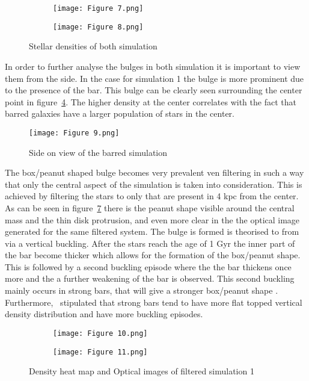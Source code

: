 \documentclass[12pt, a4paper]{article}
\begin{document}
\begin{figure}[H]
  \centering
  \begin{subfigure}{.5\textwidth}
    \centering
    \texttt{[image: Figure 7.png]}
    \label{fig:star_density_1}
  \end{subfigure}%
  \begin{subfigure}{.5\textwidth}
    \centering
    \texttt{[image: Figure 8.png]}
    \label{fig:star_density_2}
  \end{subfigure}
  \caption{Stellar densities of both simulation}
  \label{fig:Stellar_component_2sim}
\end{figure}

In order to further analyse the bulges in both simulation it is important to view them from the side. In the case for simulation 1 the bulge is more prominent due to the presence of the bar. This bulge can be clearly seen surrounding the center point in figure~\ref{fig:side_on_bar}. The higher density at the center correlates with the fact that barred galaxies have a larger population of stars in the center. 

\begin{figure}[H]
  \centering
  \texttt{[image: Figure 9.png]}
  \caption{Side on view of the barred simulation}\label{fig:side_on_bar}
\end{figure}

The box/peanut shaped bulge becomes very prevalent ven filtering in such a way that only the central aspect of the simulation is taken into consideration. This is achieved by filtering the stars to only that are present in 4 kpc from the center. As can be seen in figure~\ref{fig:filter_sphere_com_1} there is the peanut shape visible around the central mass and the thin disk protrusion, and even more clear in the the optical image generated for the same filtered system. The bulge is formed is theorised to from via a vertical buckling. After the stars reach the age of 1 Gyr the inner part of the bar become thicker which allows for the formation of the box/peanut shape. This is followed by a second buckling episode where the the bar thickens once more and the a further weakening of the bar is observed. This second buckling mainly occurs in strong bars, that will give a stronger box/peanut shape \parencite{BibEntry2019Aug}. Furthermore,~\cite{BibEntry2019Aug} stipulated that strong bars tend to have more flat topped vertical density distribution and have more buckling episodes.

\begin{figure}[H]
  \centering
  \begin{subfigure}{.5\textwidth}
    \centering
    \texttt{[image: Figure 10.png]}
    \label{fig:filter_sphere_heat_map_1}
  \end{subfigure}%
  \begin{subfigure}{.5\textwidth}
    \centering
    \texttt{[image: Figure 11.png]}
    \label{fig:filter_sphere_optical_1}
  \end{subfigure}
  \caption{Density heat map and Optical images of filtered simulation 1}
  \label{fig:filter_sphere_com_1}
\end{figure}
\end{document}
